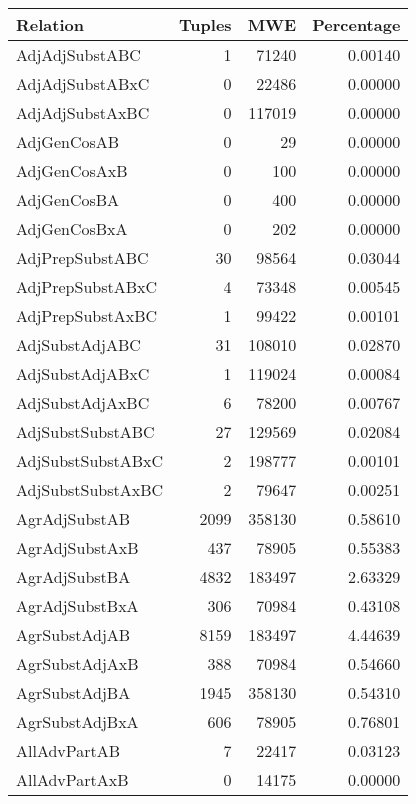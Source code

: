 \begin{table}[t]
    \centering
    \scriptsize
    \begin{tabular}{|l|r|r|r|}
        \hline 
        \textbf{Relation} & \textbf{Tuples} & \textbf{MWE} & \textbf{Percentage} \\
        \hline
        AdjAdjSubstABC & 1 & 71240 & 0.00140 \\
        AdjAdjSubstABxC & 0 & 22486 & 0.00000 \\
        AdjAdjSubstAxBC & 0 & 117019 & 0.00000 \\
        AdjGenCosAB & 0 & 29 & 0.00000 \\
        AdjGenCosAxB & 0 & 100 & 0.00000 \\
        AdjGenCosBA & 0 & 400 & 0.00000 \\
        AdjGenCosBxA & 0 & 202 & 0.00000 \\
        AdjPrepSubstABC & 30 & 98564 & 0.03044 \\
        AdjPrepSubstABxC & 4 & 73348 & 0.00545 \\
        AdjPrepSubstAxBC & 1 & 99422 & 0.00101 \\
        AdjSubstAdjABC & 31 & 108010 & 0.02870 \\
        AdjSubstAdjABxC & 1 & 119024 & 0.00084 \\
        AdjSubstAdjAxBC & 6 & 78200 & 0.00767 \\
        AdjSubstSubstABC & 27 & 129569 & 0.02084 \\
        AdjSubstSubstABxC & 2 & 198777 & 0.00101 \\
        AdjSubstSubstAxBC & 2 & 79647 & 0.00251 \\
        AgrAdjSubstAB & 2099 & 358130 & 0.58610 \\
        AgrAdjSubstAxB & 437 & 78905 & 0.55383 \\
        AgrAdjSubstBA & 4832 & 183497 & 2.63329 \\
        AgrAdjSubstBxA & 306 & 70984 & 0.43108 \\
        AgrSubstAdjAB & 8159 & 183497 & 4.44639 \\
        AgrSubstAdjAxB & 388 & 70984 & 0.54660 \\
        AgrSubstAdjBA & 1945 & 358130 & 0.54310 \\
        AgrSubstAdjBxA & 606 & 78905 & 0.76801 \\
        AllAdvPartAB & 7 & 22417 & 0.03123 \\
        AllAdvPartAxB & 0 & 14175 & 0.00000 \\

\end{tabular}
\end{table}
